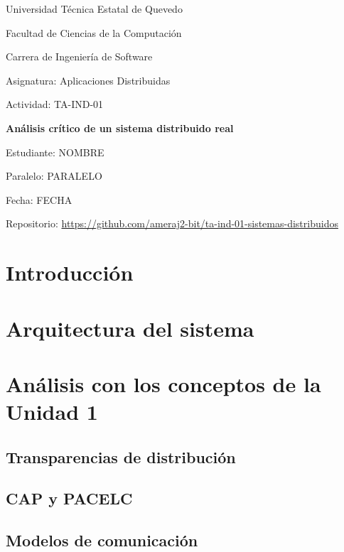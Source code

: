 \documentclass[12pt,a4paper]{article}
\begin{document}
\begin{titlepage}
  \centering
  {\Large Universidad Técnica Estatal de Quevedo\par}
  {\large Facultad de Ciencias de la Computación\par}
  {\large Carrera de Ingeniería de Software\par}
  \vspace{1cm}
  {\large Asignatura: Aplicaciones Distribuidas\par}
  {\large Actividad: TA-IND-01\par}
  \vspace{1cm}
  {\Large\bfseries Análisis crítico de un sistema distribuido real\par}
  \vspace{1cm}
  Estudiante: NOMBRE\par
  Paralelo: PARALELO\par
  Fecha: FECHA\par
  Repositorio: \url{https://github.com/ameraj2-bit/ta-ind-01-sistemas-distribuidos}
\end{titlepage}

\begin{abstract}
\end{abstract}

\tableofcontents
\newpage

\section{Introducción}
\section{Arquitectura del sistema}
\section{Análisis con los conceptos de la Unidad 1}
\subsection{Transparencias de distribución}
\subsection{CAP y PACELC}
\subsection{Modelos de comunicación}
\end{document}
